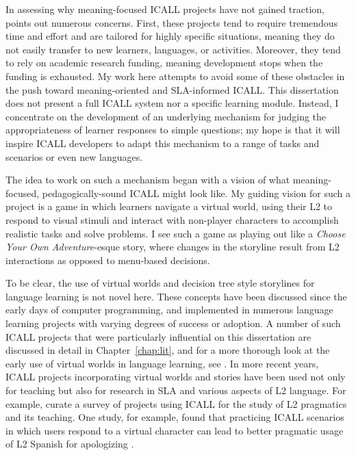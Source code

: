 In assessing why meaning-focused ICALL projects have not gained traction, \citet{schulze2010taking} points out numerous concerns. First, these projects tend to require tremendous time and effort and are tailored for highly specific situations, meaning they do not easily transfer to new learners, languages, or activities. Moreover, they tend to rely on academic research funding, meaning development stops when the funding is exhausted. My work here attempts to avoid some of these obstacles in the push toward meaning-oriented and SLA-informed ICALL. This dissertation does not present a full ICALL system nor a specific learning module. Instead, I concentrate on the development of an underlying mechanism for judging the appropriateness of learner responses to simple questions; my hope is that it will inspire ICALL developers to adapt this mechanism to a range of tasks and scenarios or even new languages.

The idea to work on such a mechanism began with a vision of what meaning-focused, pedagogically-sound ICALL might look like.
My guiding vision for such a project is a game in which learners navigate a virtual world, using their L2 to respond to visual stimuli and interact with non-player characters to accomplish realistic tasks and solve problems. I see such a game as playing out like a \textit{Choose Your Own Adventure}-esque story, where changes in the storyline result from L2 interactions as opposed to menu-based decisions. 

To be clear, the use of virtual worlds and decision tree style storylines for language learning is not novel here. These concepts have been discussed since the early days of computer programming, and implemented in numerous language learning projects with varying degrees of success or adoption. A number of such ICALL projects that were particularly influential on this dissertation are discussed in detail in Chapter~\ref{chap:lit}, and for a more thorough look at the early use of virtual worlds in language learning, see \citet{Hollandetal:95}. In more recent years, ICALL projects incorporating virtual worlds and stories have been used not only for teaching but also for research in SLA and various aspects of L2 language. For example, \citet{taguchi2013technology} curate a survey of projects using ICALL for the study of L2 pragmatics and its teaching. One study, for example, found that practicing ICALL scenarios in which users respond to a virtual character can lead to better pragmatic usage of L2 Spanish for apologizing \cite{sykes2013learner}. 

